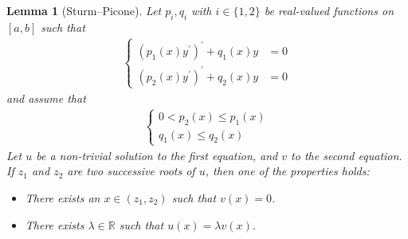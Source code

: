 \documentclass[final,3p,authoryear,12pt]{elsarticle}
\newtheorem{lemma}{Lemma}
\begin{document}
\begin{lemma}[Sturm--Picone]
\label{lemma:SturmPicone}
Let $p_{i},q_{i}$ with $i\in\{1,2\}$ be real-valued functions on $[a,b]$ such that 
\begin{align}
    \begin{cases}
        (p_{1}(x)y^{\prime})^{\prime}+q_{1}(x)y &= 0 \\
        (p_{2}(x)y^{\prime})^{\prime}+q_{2}(x)y &= 0 
    \end{cases}
\end{align}
and assume that
\begin{align}
    \begin{cases}
        0 < p_{2}(x) \le p_{1}(x) \\
        q_{1}(x) \le q_{2}(x)
    \end{cases}
\end{align}
Let $u$ be a non-trivial solution to the first equation, and $v$ to the second equation. If $z_{1}$ and $z_{2}$ are two successive roots of $u$, then one of the properties holds:
\begin{itemize}
    \item There exists an $x\in(z_{1},z_{2})$ such that $v(x)=0$.
    \item There exists $\lambda \in \mathbb{R}$ such that $u(x) = \lambda v(x)$.
\end{itemize}
\end{lemma}
\end{document}
